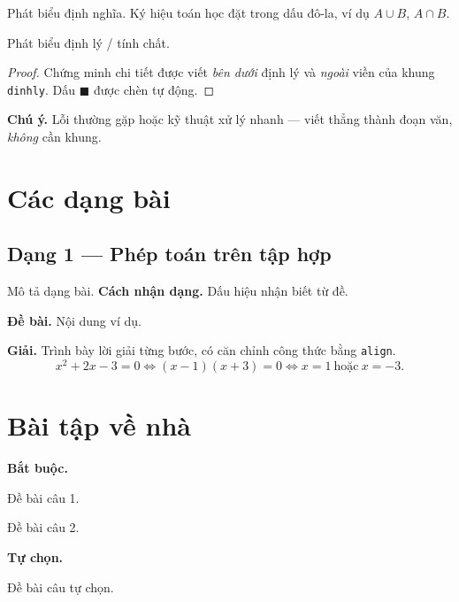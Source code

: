 \documentclass[12pt, a4paper]{report}
\begin{document}
\begin{dinhnghia}
  Phát biểu định nghĩa. Ký hiệu toán học đặt trong dấu đô-la, ví dụ \(A \cup B\), \(A \cap B\).
\end{dinhnghia}

\begin{dinhly}
  Phát biểu định lý / tính chất.
\end{dinhly}

\begin{proof}
  Chứng minh chi tiết được viết \emph{bên dưới} định lý và \emph{ngoài} viền của khung \texttt{dinhly}. Dấu $\blacksquare$ được chèn tự động.
\end{proof}

\textbf{Chú ý.} Lỗi thường gặp hoặc kỹ thuật xử lý nhanh — viết thẳng thành đoạn văn, \emph{không} cần khung.

\section{Các dạng bài}

\subsection*{Dạng 1 — Phép toán trên tập hợp}
Mô tả dạng bài. \textbf{Cách nhận dạng.} Dấu hiệu nhận biết từ đề.

\begin{vidu}[1]
  \textbf{Đề bài.} Nội dung ví dụ.

  \textbf{Giải.} Trình bày lời giải từng bước, có căn chỉnh công thức bằng \texttt{align}.
  \[
    x^2 + 2x - 3 = 0 \iff (x-1)(x+3) = 0 \iff x = 1 \ \text{hoặc}\ x = -3.
  \]
\end{vidu}

\section{Bài tập về nhà}

\textbf{Bắt buộc.}

\begin{baitap}[Câu 1]
  Đề bài câu 1.
\end{baitap}

\begin{baitap}[Câu 2]
  Đề bài câu 2.
\end{baitap}

\textbf{Tự chọn.}

\begin{baitap}[Câu 1]
  Đề bài câu tự chọn.
\end{baitap}
\end{document}
